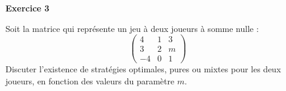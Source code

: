 \documentclass[12pt]{article}
\begin{document}
\begin{center}
\textbf{Exercice 3}
\end{center}
Soit la matrice qui repr\'esente un jeu \`a deux joueurs \`a somme nulle :
\begin{equation*}
\begin{pmatrix}
4&1&3\\
3&2&m\\
-4&0&1
\end{pmatrix}
\end{equation*}
Discuter l'existence de strat\'egies optimales, pures ou mixtes pour les deux joueurs, en fonction des valeurs du param\`etre $m$.
\end{document}
